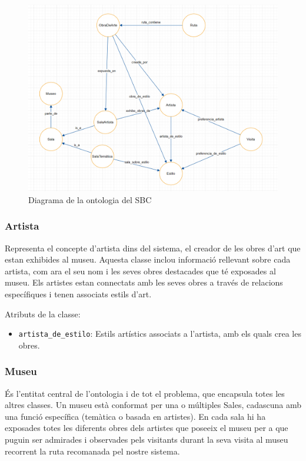 \documentclass[a4paper]{article}
\begin{document}
	\begin{figure}[H]
		\centering
		\includegraphics[width=0.75\linewidth]{images/ontologia.png}
		\caption{Diagrama de la ontologia del SBC}
	\end{figure}
	
	\subsubsection*{Artista}
	Representa el concepte d'artista dins del sistema, el creador de les obres d'art que estan exhibides al museu. Aquesta classe inclou informació rellevant sobre cada artista, com ara el seu nom i les seves obres destacades que té exposades al museu. Els artistes estan connectats amb les seves obres a través de relacions específiques i tenen associats estils d'art.
	
	Atributs de la classe:
	\begin{itemize}
		\item \texttt{artista\_de\_estilo}: Estils artístics associats a l’artista, amb els quals crea les obres.
	\end{itemize}
	
	
	\subsubsection*{Museu}
	És l'entitat central de l'ontologia i de tot el problema, que encapsula totes les altres classes. Un museu està conformat per una o múltiples Sales, cadascuna amb una funció específica (temàtica o basada en artistes). En cada sala hi ha exposades totes les diferents obres dels artistes que poseeix el museu per a que puguin ser admirades i observades pels visitants durant la seva visita al museu recorrent la ruta recomanada pel nostre sistema.
	
\end{document}
